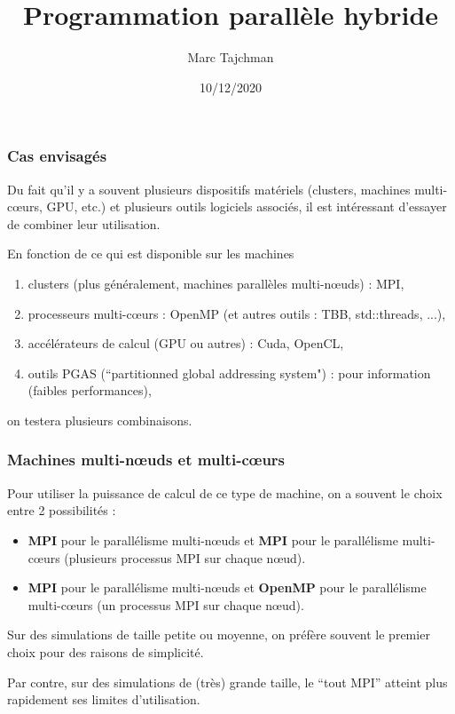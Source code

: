 \documentclass{beamer}
\title{Programmation parallèle hybride}
\author{Marc Tajchman}\institute{CEA - DEN/DM2S/STMF/LMES}
\date{10/12/2020}
\begin{document}
\begin{frame}
	\titlepage
\end{frame}

\large
\begin{frame}
	\frametitle{Cas envisagés}

Du fait qu'il y a souvent plusieurs dispositifs matériels (clusters, machines multi-c\oe urs, GPU, etc.) et plusieurs outils logiciels associés, il est intéressant d'essayer de combiner leur utilisation.

\vfill
En fonction de ce qui est disponible sur les machines
\begin{enumerate}
	\item clusters (plus généralement, machines parallèles multi-n\oe uds) : MPI,
	\item processeurs multi-c\oe urs : OpenMP (et autres outils : TBB, std::threads, ...),
	\item accélérateurs de calcul (GPU ou autres) : Cuda, OpenCL,
	\item outils PGAS (``partitionned global addressing system") : pour information (faibles performances),
\end{enumerate}

\vfill
on testera plusieurs combinaisons.
\end{frame}

\begin{frame}
\frametitle{Machines multi-n\oe uds et multi-c\oe urs}

Pour utiliser la puissance de calcul de ce type de machine, on a souvent le choix entre 2 possibilités :
\medskip
\begin{itemize}
	\item {\bf MPI} pour le parallélisme multi-n\oe uds et {\bf MPI} pour le parallélisme multi-c\oe urs (plusieurs processus MPI sur chaque n\oe ud).
\medskip
	\item {\bf MPI} pour le parallélisme multi-n\oe uds et {\bf OpenMP} pour le parallélisme multi-c\oe urs (un processus MPI sur chaque n\oe ud).
\end{itemize}
\vfill

Sur des simulations de taille petite ou moyenne, on préfère souvent le premier choix pour des raisons de simplicité. 

Par contre, sur des simulations de (très) grande taille, le ``tout MPI'' atteint plus rapidement ses limites d'utilisation.
\end{frame}
\end{document}
